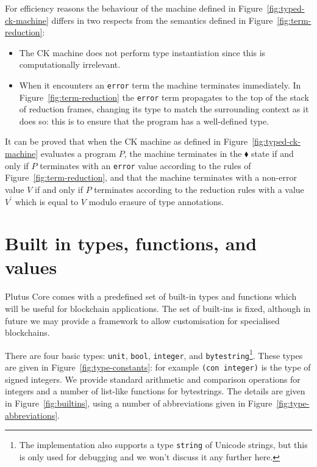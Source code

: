 \documentclass[a4paper]{article}
\newcommand{\keyword}[1]{\texttt{#1}}
\newcommand{\conUnitType}{\keyword{unit}}
\newcommand{\conBooleanType}{\keyword{bool}}
\newcommand{\conIntegerType}{\keyword{integer}}
\newcommand{\conBytestringType}{\keyword{bytestring}}
\newcommand{\conStringType}{\keyword{string}}
\begin{document}
For efficiency reasons the behaviour of the machine defined in
Figure~\ref{fig:typed-ck-machine} differs in two respects from the semantics
defined in Figure~\ref{fig:term-reduction}:
\begin{itemize}
\item The CK machine does not perform type instantiation since this
  is computationally irrelevant.
\item When it encounters an \texttt{error} term the machine terminates
  immediately.  In Figure~\ref{fig:term-reduction} the \texttt{error}
  term propagates to the top of the stack of reduction frames,
  changing its type to match the surrounding context as it does so:
  this is to ensure that the program has a well-defined type.
\end{itemize}
\noindent It can be proved that when the CK machine as defined in
Figure~\ref{fig:typed-ck-machine} evaluates a program $P$, the machine
terminates in the $\blacklozenge$ state if and only if $P$ terminates
with an \texttt{error} value according to the rules of
Figure~\ref{fig:term-reduction}, and that the machine terminates with
a non-error value $V$ if and only if $P$ terminates according to the
reduction rules with a value $V^{\prime}$ which is equal to $V$
modulo erasure of type annotations.


\section{Built in types, functions, and values}
\label{sec:builtins}
Plutus Core comes with a predefined set of built-in types and
functions which will be useful for blockchain applications.  The set
of built-ins is fixed, although in future we may provide a framework
to allow customisation for specialised blockchains.

There are four basic types: \conUnitType, \conBooleanType, \conIntegerType,
and \conBytestringType\footnote{The implementation also supports a type
\conStringType{} of Unicode strings, but this is only used for debugging and we won't
discuss it any further here.}.  These types are given in
Figure~\ref{fig:type-constants}: for example \texttt{(con \conIntegerType)} is
the type of signed integers.  We provide standard arithmetic and comparison
operations for integers and a number of list-like functions for bytestrings. The
details are given in Figure~\ref{fig:builtins}, using a number of abbreviations
given in Figure~\ref{fig:type-abbreviations}.
\end{document}
